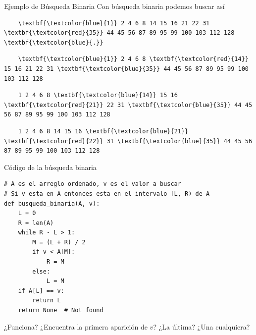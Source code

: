 \documentclass[compress]{beamer}
\begin{document}
\begin{frame}[fragile]{Ejemplo de Búsqueda Binaria}
  Con búsqueda binaria podemos buscar así
  \begin{Verbatim}
    \textbf{\textcolor{blue}{1}} 2 4 6 8 14 15 16 21 22 31 \textbf{\textcolor{red}{35}} 44 45 56 87 89 95 99 100 103 112 128 \textbf{\textcolor{blue}{.}}
  \end{Verbatim}
  \pause
  \begin{Verbatim}
    \textbf{\textcolor{blue}{1}} 2 4 6 8 \textbf{\textcolor{red}{14}} 15 16 21 22 31 \textbf{\textcolor{blue}{35}} 44 45 56 87 89 95 99 100 103 112 128
  \end{Verbatim}
  \pause
  \begin{Verbatim}
    1 2 4 6 8 \textbf{\textcolor{blue}{14}} 15 16 \textbf{\textcolor{red}{21}} 22 31 \textbf{\textcolor{blue}{35}} 44 45 56 87 89 95 99 100 103 112 128
  \end{Verbatim}
  \pause
  \begin{Verbatim}
    1 2 4 6 8 14 15 16 \textbf{\textcolor{blue}{21}} \textbf{\textcolor{red}{22}} 31 \textbf{\textcolor{blue}{35}} 44 45 56 87 89 95 99 100 103 112 128
  \end{Verbatim}
  \pause
\end{frame}

\begin{frame}[fragile]{Código de la búsqueda binaria}
\begin{lstlisting}
# A es el arreglo ordenado, v es el valor a buscar
# Si v esta en A entonces esta en el intervalo [L, R) de A
def busqueda_binaria(A, v):
    L = 0
    R = len(A)
    while R - L > 1:
        M = (L + R) / 2
        if v < A[M]:
            R = M
        else:
            L = M
    if A[L] == v:
        return L
    return None  # Not found
\end{lstlisting}
¿Funciona? ¿Encuentra la primera aparición de $v$? ¿La última? ¿Una cualquiera?


\end{frame}
\end{document}
